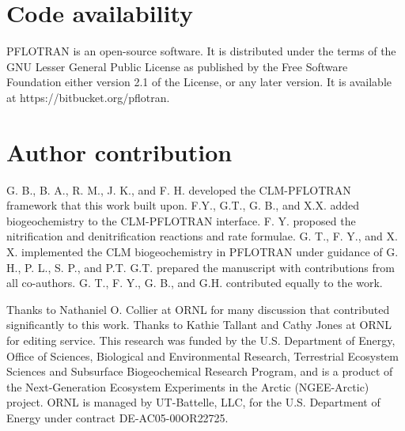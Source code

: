 \documentclass[gmd, manuscript]{copernicus}
\begin{document}


%
\section{Code availability}
PFLOTRAN is an open-source software. It is distributed under the terms of the
GNU Lesser General Public License as published by the Free Software Foundation
either version 2.1 of the License, or any later version. It is available at
https://bitbucket.org/pflotran. 

\section{Author contribution}
G. B., B. A., R. M., J. K., and F. H. developed the CLM-PFLOTRAN framework that this
work built upon. F.Y., G.T., G. B., and X.X. added biogeochemistry to the CLM-PFLOTRAN
interface. F. Y. proposed the nitrification and denitrification reactions and
rate formulae. G. T., F. Y., and X. X. implemented the CLM
biogeochemistry in PFLOTRAN under guidance of G. H., P. L., S. P., and P.T.
G.T. prepared the manuscript with contributions from all co-authors. 
G. T., F. Y., G. B., and G.H. contributed equally to the work.  

\begin{acknowledgements}
Thanks to Nathaniel O. Collier at ORNL for many discussion that contributed significantly to this work.
Thanks to Kathie Tallant and Cathy Jones at ORNL for editing service. This research was funded by the U.S. Department of Energy, Office of Sciences,
Biological and Environmental Research, Terrestrial Ecosystem Sciences and
Subsurface Biogeochemical Research Program, and is a product of the
Next-Generation Ecosystem Experiments in the Arctic (NGEE-Arctic) project.
ORNL is managed by UT-Battelle, LLC, for the U.S. Department of Energy under
contract DE-AC05-00OR22725.
\end{acknowledgements}



\end{document}
